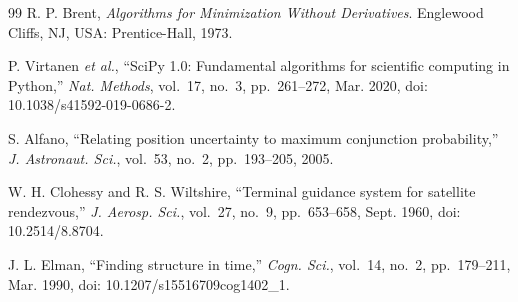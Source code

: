 \documentclass[conference]{IEEEtran}
\begin{document}
\begin{thebibliography}{99}
R. P. Brent, \emph{Algorithms for Minimization Without Derivatives}.
Englewood Cliffs, NJ, USA: Prentice-Hall, 1973.

P. Virtanen \emph{et al.}, ``SciPy 1.0: Fundamental algorithms for scientific
computing in Python,'' \emph{Nat. Methods}, vol.~17, no.~3, pp.~261--272,
Mar. 2020, doi: 10.1038/s41592-019-0686-2.

S. Alfano, ``Relating position uncertainty to maximum conjunction
probability,'' \emph{J. Astronaut. Sci.}, vol.~53, no.~2, pp.~193--205, 2005.

W. H. Clohessy and R. S. Wiltshire, ``Terminal guidance system for satellite
rendezvous,'' \emph{J. Aerosp. Sci.}, vol.~27, no.~9, pp.~653--658,
Sept. 1960, doi: 10.2514/8.8704.

J. L. Elman, ``Finding structure in time,'' \emph{Cogn. Sci.}, vol.~14,
no.~2, pp.~179--211, Mar. 1990, doi: 10.1207/s15516709cog1402\_1.

\end{thebibliography}
\end{document}

